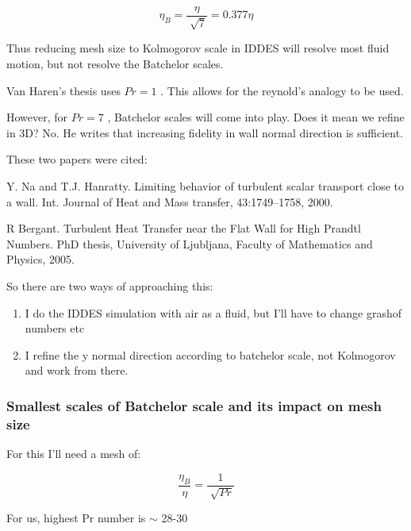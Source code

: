 \documentclass[12pt]{article}
\renewcommand{\_}{\kern-1.5pt\textunderscore\kern-1.5pt}
\begin{document}
 \[  \eta _{B}=\frac{ \eta }{\sqrt[]{7}}=0.377 \eta   \] \par

Thus reducing mesh size to Kolmogorov scale in IDDES will resolve most fluid motion, but not resolve the Batchelor scales.\par

Van Haren’s thesis uses  \( Pr=1 \) . This allows for the reynold’s analogy to be used.\par

However, for  \( Pr=7 \) , Batchelor scales will come into play. Does it mean we refine in 3D? No. He writes that increasing fidelity in wall normal direction is sufficient.\par

These two papers were cited:\par

Y. Na and T.J. Hanratty. Limiting behavior of turbulent scalar transport close to a wall. Int. Journal of Heat and Mass transfer, 43:1749–1758, 2000.\par

R Bergant. Turbulent Heat Transfer near the Flat Wall for High Prandtl Numbers. PhD thesis, University of Ljubljana, Faculty of Mathematics and Physics, 2005.\par

So there are two ways of approaching this:\par

\begin{enumerate}
	\item I do the IDDES simulation with air as a fluid, but I’ll have to change grashof numbers etc\par

	\item I refine the y normal direction according to batchelor scale, not Kolmogorov and work from there.
\end{enumerate}\par
\subsubsection{Smallest scales of Batchelor scale and its impact on mesh size}
For this I’ll need a mesh of:\par

 \[ \frac{ \eta _{B}}{ \eta }=\frac{1}{\sqrt[]{Pr}} \] \par

For us, highest Pr number is $ \sim $ 28-30\par
\end{document}
